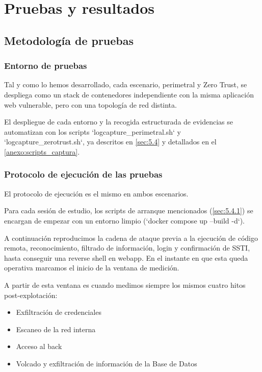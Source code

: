 \documentclass[11pt,spanish,listoffigures,listoftables]{tfgetsinf}
\begin{document}
\chapter{Pruebas y resultados}
\label{sec:6}

    \section{Metodología de pruebas}
    \label{sec:6.1}
        \subsection{Entorno de pruebas}

        Tal y como lo hemos desarrollado, cada escenario, perimetral y Zero Trust, se despliega como un stack de contenedores independiente con la misma aplicación web vulnerable, pero con una topología de red distinta. 

        El despliegue de cada entorno y la recogida estructurada de evidencias se automatizan con los scripts `logcapture\_perimetral.sh` y `logcapture\_zerotrust.sh`, ya descritos en \cref{sec:5.4} y detallados en el \ref{anexo:scripts_captura}.
        
        \subsection{Protocolo de ejecución de las pruebas}
        El protocolo de ejecución es el mismo en ambos escenarios.
        
        Para cada sesión de estudio, los scripts de arranque mencionados (\cref{sec:5.4.1}) se encargan de empezar con un entorno limpio (`docker compose up --build -d`). 
        
        A continuación reproducimos la cadena de ataque previa a la ejecución de código remota, reconocimiento, filtrado de información, login y confirmación de SSTI, hasta conseguir una reverse shell en webapp. En el instante en que esta queda operativa marcamos el inicio de la ventana de medición.
        
        A partir de esta ventana es cuando medimos siempre los mismos cuatro hitos post-explotación:
        \begin{itemize}
            \item Exfiltración de credenciales
            \item Escaneo de la red interna
            \item Acceso al back
            \item Volcado y exfiltración de información de la Base de Datos
        \end{itemize}
        
\end{document}
